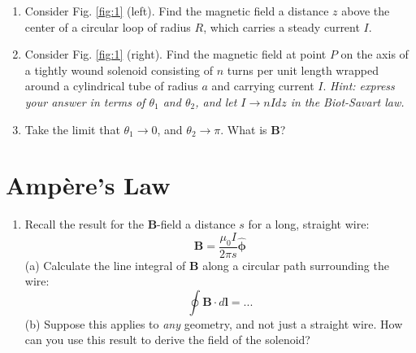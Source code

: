 \documentclass[10pt]{article}
\begin{document}
\begin{enumerate}
\item Consider Fig. \ref{fig:1} (left). Find the magnetic field a distance $z$ above the center of a circular loop of radius $R$, which carries a steady current $I$. \\ \vspace{5cm}
\item Consider Fig. \ref{fig:1} (right).  Find the magnetic field at point $P$ on the axis of a tightly wound solenoid consisting of $n$ turns per unit length wrapped around a cylindrical tube of radius $a$ and carrying current $I$.  \textit{Hint: express your answer in terms of $\theta_1$ and $\theta_2$, and let $I \to nIdz$ in the Biot-Savart law.} \\ \vspace{5cm}
\item Take the limit that $\theta_1 \to 0$, and $\theta_2 \to \pi$.  What is $\mathbf{B}$?  \\ \vspace{2cm}
\end{enumerate}

\section{Amp\`{e}re's Law}

\begin{enumerate}
\item Recall the result for the $\mathbf{B}$-field a distance $s$ for a long, straight wire:
\begin{equation}
\mathbf{B} = \frac{\mu_0 I}{2\pi s}\hat{\boldsymbol{\phi}}
\end{equation}
(a) Calculate the line integral of $\mathbf{B}$ along a circular path surrounding the wire:
\begin{equation}
\oint \mathbf{B} \cdot d\mathbf{l} = ...
\end{equation}
(b) Suppose this applies to \textit{any} geometry, and not just a straight wire.  How can you use this result to derive the field of the solenoid?
\end{enumerate}
\end{document}
